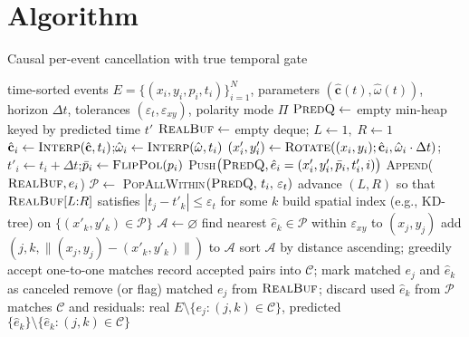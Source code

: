 \section{Algorithm}
\begin{algorithm}[H] %
\caption{Causal per-event cancellation with true temporal gate}
\label{alg:cancellation}
\begin{algorithmic}[1]
\Require time-sorted events $E=\{(x_i,y_i,p_i,t_i)\}_{i=1}^N$, parameters $(\hat{\mathbf c}(t),\hat{\omega}(t))$, horizon $\Delta t$, tolerances $(\varepsilon_t,\varepsilon_{xy})$, polarity mode $\Pi$
\State $\textsc{PredQ}\gets$ empty min-heap keyed by predicted time $t'$
\State $\textsc{RealBuf}\gets$ empty deque; \quad $L\gets 1,\; R\gets 1$
  \State $\hat{\mathbf c}_i \gets \textsc{Interp}(\hat{\mathbf c},t_i)$;\quad $\hat{\omega}_i \gets \textsc{Interp}(\hat{\omega},t_i)$
  \State $(x'_i,y'_i)\gets \textsc{Rotate}((x_i,y_i);\hat{\mathbf c}_i,\hat{\omega}_i\cdot \Delta t)$;\quad $t'_i\gets t_i+\Delta t$;\quad $\bar p_i\gets \textsc{FlipPol}(p_i)$
  \State \textsc{Push}$\big(\textsc{PredQ},\hat e_i=(x'_i,y'_i,\bar p_i,t'_i,i)\big)$
  \State \textsc{Append}($\textsc{RealBuf}, e_i$)
     \State $\mathcal{P}\gets$ \textsc{PopAllWithin}$(\textsc{PredQ},\,t_i,\,\varepsilon_t)$ 
     \State advance $(L,R)$ so that $\textsc{RealBuf}[L{:}R]$ satisfies $|t_j - t'_k|\le \varepsilon_t$ for some $k$ \label{ln:window}
     \State build spatial index (e.g., KD-tree) on $\{(x'_k,y'_k)\in\mathcal{P}\}$
     \State $\mathcal{A}\gets\varnothing$ 
        \State find nearest $\hat e_k\in\mathcal{P}$ within $\varepsilon_{xy}$ to $(x_j,y_j)$
            \State add $(j,k,\| (x_j,y_j)-(x'_k,y'_k)\|)$ to $\mathcal{A}$
        \EndIf
     \EndFor
     \State sort $\mathcal{A}$ by distance ascending; greedily accept one-to-one matches
     \State record accepted pairs into $\mathcal{C}$; mark matched $e_j$ and $\hat e_k$ as canceled
     \State remove (or flag) matched $e_j$ from $\textsc{RealBuf}$; discard used $\hat e_k$ from $\mathcal{P}$
  \EndWhile
\EndFor
\State \Return matches $\mathcal{C}$ and residuals: real $E\setminus\{e_j:(j,k)\in\mathcal{C}\}$, predicted $\{\hat e_k\}\setminus\{\hat e_k:(j,k)\in\mathcal{C}\}$
\end{algorithmic}
\end{algorithm}


